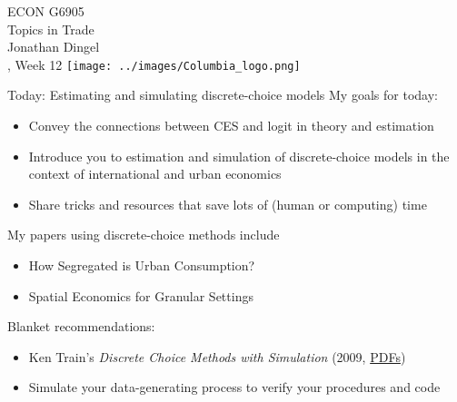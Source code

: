 \documentclass[11pt,notes=hide,aspectratio=169]{beamer}
\begin{document}
\begin{frame}[plain]
\begin{center}
\large
\textcolor{columbiadarkblue}{ECON G6905\\
Topics in Trade\\ 
Jonathan Dingel\\
\semester, Week 12}
\vfill 
\texttt{[image: ../images/Columbia\_logo.png]}
\end{center}
\end{frame}
\begin{frame}{Today: Estimating and simulating discrete-choice models}
My goals for today:
\begin{itemize}
	\item Convey the connections between CES and logit in theory and estimation
	\item Introduce you to estimation and simulation of discrete-choice models in the context of international and urban economics
	\item Share tricks and resources that save lots of (human or computing) time
\end{itemize}
My papers using discrete-choice methods include
\begin{itemize}
	\item How Segregated is Urban Consumption?
	\item Spatial Economics for Granular Settings
\end{itemize}
Blanket recommendations:
\begin{itemize}
\item Ken Train's \textit{Discrete Choice Methods with Simulation} (2009, \href{https://eml.berkeley.edu/books/choice2.html}{PDFs})
\item Simulate your data-generating process to verify your procedures and code
\end{itemize}
\end{frame}
\end{document}
